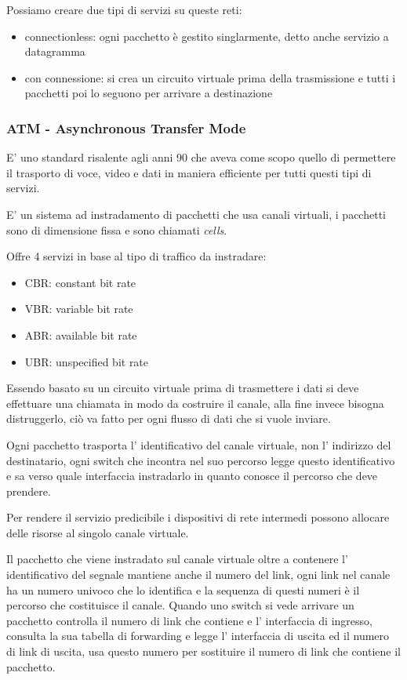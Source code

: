 Possiamo creare due tipi di servizi su queste reti:
\begin{itemize}
    \item connectionless: ogni pacchetto è gestito singlarmente, detto anche servizio a datagramma
    \item con connessione: si crea un circuito virtuale prima della trasmissione e tutti i pacchetti poi lo seguono per arrivare a destinazione
\end{itemize}

\subsubsection{ATM - Asynchronous Transfer Mode}
E' uno standard risalente agli anni 90 che aveva come scopo quello di permettere il trasporto di voce, video e dati in maniera efficiente per tutti questi tipi di servizi.

E' un sistema ad instradamento di pacchetti che usa canali virtuali, i pacchetti sono di dimensione fissa e sono chiamati \emph{cells}.

Offre 4 servizi in base al tipo di traffico da instradare:
\begin{itemize}
    \item CBR: constant bit rate
    \item VBR: variable bit rate
    \item ABR: available bit rate
    \item UBR: unspecified bit rate
\end{itemize}

Essendo basato su un circuito virtuale prima di trasmettere i dati si deve effettuare una chiamata in modo da costruire il canale, alla fine invece bisogna distruggerlo, ciò va fatto per ogni flusso di dati che si vuole inviare.

Ogni pacchetto trasporta l' identificativo del canale virtuale, non l' indirizzo del destinatario, ogni switch che incontra nel suo percorso legge questo identificativo e sa verso quale interfaccia instradarlo in quanto conosce il percorso che deve prendere.

Per rendere il servizio predicibile i dispositivi di rete intermedi possono allocare delle risorse al singolo canale virtuale.

Il pacchetto che viene instradato sul canale virtuale oltre a contenere l' identificativo del segnale mantiene anche il numero del link, ogni link nel canale ha un numero univoco che lo identifica e la sequenza di questi numeri è il percorso che costituisce il canale.
Quando uno switch si vede arrivare un pacchetto controlla il numero di link che contiene e l' interfaccia di ingresso, consulta la sua tabella di forwarding e legge l' interfaccia di uscita ed il numero di link di uscita, usa questo numero per sostituire il numero di link che contiene il pacchetto.

